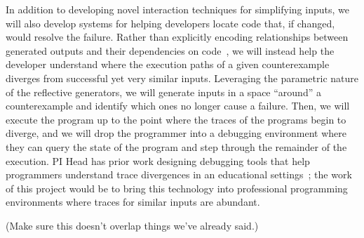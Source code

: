 
In addition to developing novel interaction techniques for simplifying inputs,
we will also develop systems for helping developers locate code that, if
changed, would resolve the failure. Rather than explicitly encoding
relationships between generated outputs and their dependencies on
code~\cite{ref:ko2009finding}, we will instead help the developer
understand where the execution paths of a given counterexample diverges from
successful yet very similar inputs. Leveraging the parametric nature of the
reflective generators, we will generate inputs in a space ``around'' a
counterexample and identify which ones no longer cause a failure.  Then, we will
execute the program up to the point where the traces of the programs begin to
diverge, and we will drop the programmer into a debugging environment where
they can query the state of the program and step through the remainder of the
execution. PI Head has prior work designing debugging tools that help
programmers understand trace divergences in an educational
settings~\cite{ref:suzuki2017tracediff}; the work of this project would be to
bring this technology into professional programming environments where traces
for similar inputs are abundant.







(Make sure this doesn't overlap things we've already said.)


